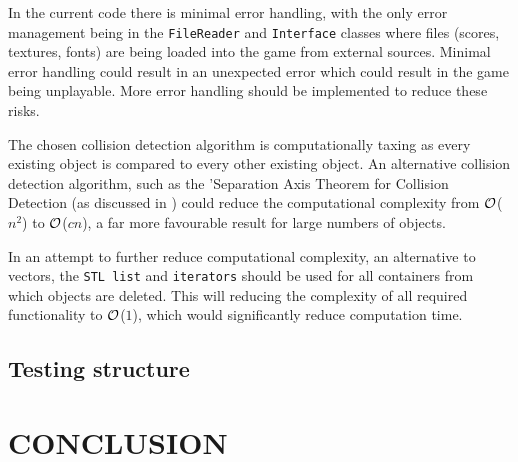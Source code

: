 \documentclass[10pt,twocolumn]{witseiepaper}
\begin{document}
In the current code there is minimal error handling, with the only error management being in the \texttt{FileReader} and \texttt{Interface} classes where files (scores, textures, fonts) are being loaded into the game from external sources. Minimal error handling could result in an unexpected error which could result in the game being unplayable. More error handling should be implemented to reduce these risks.

The chosen collision detection algorithm is computationally taxing as every existing object is compared to every other existing object. An alternative collision detection algorithm, such as the 'Separation Axis Theorem for Collision Detection (as discussed in \cite{Collision_detection}) could reduce the computational complexity from $\cal{O}$($n^{2}$) to $\cal{O}$($cn$), a far more favourable result for large numbers of objects.

In an attempt to further reduce computational complexity, an alternative to vectors, the \texttt{STL list} and \texttt{iterators} should be used for all containers from which objects are deleted. This will reducing the complexity of all required functionality to $\cal{O}$($1$), which would significantly reduce computation time.


\subsection{Testing structure}



\section{CONCLUSION}

%



\end{document}

